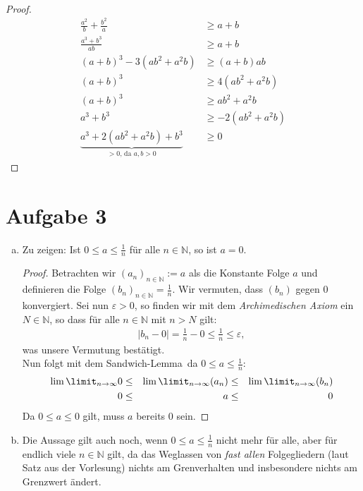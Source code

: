 \documentclass{scrreprt}
\newcommand{\NN}{\mathbb{N}}
\begin{document}
\begin{enumerate}[(a)]
\begin{align*}
				\end{align*}
				\begin{proof}
					\begin{align*}
						\frac{a^2}{b} + \frac{b^2}{a} &\geq a + b\\
						\frac{a^3 + b^3}{ab} &\geq a+b\\
						(a+b)^3 - 3(a b^2 + a^2 b) &\geq (a+b) ab\\
						(a+b)^3 & \geq 4(a b^2 + a^2 b)\\
						(a+b)^3 & \geq a b^2 + a^2 b\\
						a^3 + b^3 & \geq -2(a b^2 + a^2 b)\\
						\underbrace{a^3 + 2(a b^2 + a^2 b) + b^3}_\text{$> 0$, da $a, b > 0$} &\geq 0
					\end{align*}
				\end{proof}
		\end{enumerate}

	\section*{Aufgabe 3}
		\begin{enumerate}[(a)]
			\item
				Zu zeigen: Ist $0 \leq a \leq \frac{1}{n}$ für alle $n \in \NN$, so ist $a = 0$.\\
			\begin{proof}
				Betrachten wir $(a_n)_{n \in \NN} := a$ als die Konstante Folge $a$ und definieren die Folge $(b_n)_{n \in \NN} = \frac{1}{n}$. Wir vermuten, dass $(b_n)$ gegen 0 konvergiert. Sei nun $\varepsilon > 0$, so finden wir mit dem \emph{Archimedischen Axiom} ein $N \in \NN$, so dass für alle $n \in \NN$ mit $n > N$ gilt: 
				\begin{align*}
					|b_n - 0| = \frac{1}{n} - 0 \leq \frac{1}{n} \leq \varepsilon,
				\end{align*}
				was unsere Vermutung bestätigt.\\Nun folgt mit dem \glqq Sandwich-Lemma\grqq\ da $0 \leq a \leq \frac{1}{n}$:
				\begin{align*}
						\lim\limit_{n \to \infty} 0  &\leq&  \lim\limit_{n \to \infty} (a_n) & \leq&  \lim\limit_{n \to \infty}  (b_n) \\
						0  &\leq&  a  &\leq&  0\\
				\end{align*}
				Da $0 \leq a \leq 0$ gilt, muss $a$ bereits 0 sein.
			\end{proof}		
			\item
				Die Aussage gilt auch noch, wenn $0 \leq a \leq \frac{1}{n}$ nicht mehr für alle, aber für endlich viele $n \in \NN$ gilt, da das Weglassen von \emph{fast allen} Folgegliedern (laut Satz aus der Vorlesung) nichts am Grenverhalten und insbesondere nichts am Grenzwert ändert.
		\end{enumerate}
\end{document}
